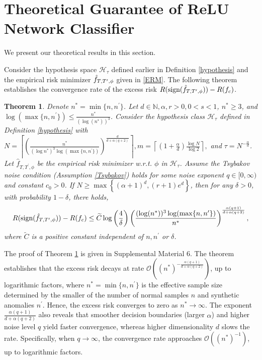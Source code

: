 \documentclass{article}
\def\NN{\mathbb N}
\newtheorem{theorem}{Theorem}
\begin{document}
\section{Theoretical Guarantee of ReLU Network Classifier}
\label{section:theoretical results}
We present our theoretical results in this section.

Consider the hypothesis space $\mathcal{H}_\tau$ defined earlier in Definition \ref{hypothesis} and the empirical risk minimizer $\Hat{f}_{T, T^\prime,\phi}$ given in \eqref{ERM}.
The following theorem establishes the convergence rate of the excess risk  $R(\text{sign}(\Hat{f}_{T, T^\prime,\phi}))-R(f_c)$.

\begin{theorem}\label{main1}
 Denote $n^* = \min\{n,n^\prime\}$.
 Let $d\in \NN, \alpha, r >0, 0 <s <1$, $n^* \geq 3$, and $\log (\max\{n,n^\prime\}) \leq \frac{n^*}{(\log(n^*))^3}$.
 Consider the hypothesis class $\mathcal{H}_\tau$ defined in Definition \ref{hypothesis} with $N =\left\lceil\left(\frac{n^*}{(\log n^*)^3\log (\max\{n,n^\prime\}) }\right)^{\frac{d}{d+ \alpha (q+2)}}\right\rceil , m= \left\lceil \left(1+ \frac{\alpha}{d}\right) \frac{\log N}{\log 2}\right\rceil,$ and $\tau = N^{-\frac{\alpha}{d}}$.  
 Let $\widehat{f}_{T, T^\prime,\phi}$ be the empirical risk minimizer w.r.t. $\phi$ in $\mathcal{H}_\tau$. Assume the Tsybakov noise condition (Assumption \ref{Tsybakov}) holds for some noise exponent $q\in [0,\infty)$ and constant $c_0>0$.
  If $N \geq \max \left\{(\alpha +1)^d, (r+1)e^d\right\}$, then for any $\delta>0 $, with probability $1-\delta$, there holds,
\begin{equation}
  R(\text{sign}(\Hat{f}_{T, T^\prime,\phi}))-R(f_c)  \leq \widetilde{C}\log \left(\frac{4}{\delta}\right) \left(\frac{(\log( n^*))^3 \log(\max\{n,n^\prime\})}{n^*}\right)^{\frac{\alpha (q+1)}{d+ \alpha (q+2)}},
\end{equation}
    where $\widetilde{C}$ is a positive constant independent of $n, n^\prime$ or $\delta$. 
\end{theorem}

The proof of Theorem \ref{main1} is given in Supplemental Material 6.
The theorem establishes that the excess risk decays at rate $\mathcal{O}\left((n^*)^{-{\frac{\alpha (q+1)}{d+ \alpha (q+2)}}}\right)$, up to logarithmic factors, where $n^* = \min\{n,n^\prime\}$ is the effective sample size determined by the smaller of the number of normal samples $n$ and synthetic anomalies $n^\prime$.
 Hence, the excess risk converges to zero as $n^* \to \infty$. The exponent $\frac{\alpha (q+1)}{d+ \alpha (q+2)}$
also reveals that smoother decision boundaries (larger $\alpha$) and higher noise level $q$ yield faster convergence, whereas higher dimensionality $d$ slows the rate. Specifically, when $q\to \infty$, the convergence rate approaches $\mathcal{O}((n^*)^{-1})$, up to logarithmic factors.
\end{document}
